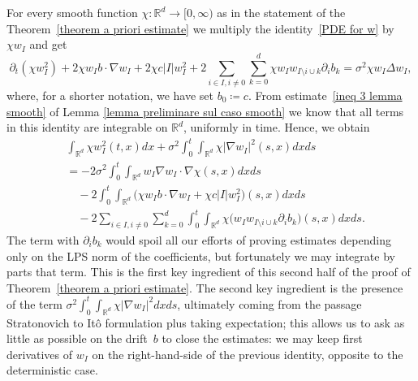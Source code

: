 \documentclass[a4paper,10pt]{article}
\newcommand\1{\mathbbm{1}}
\numberwithin{equation}{section}
\begin{document}
For every smooth function $\chi:\mathbb{R}^{d}\rightarrow \lbrack0,\infty)$ as in the statement of the Theorem~\ref{theorem a priori estimate} we multiply the identity~\eqref{PDE for w} by $\chi w_I$ and get
\[
\partial_{t}(\chi w_{I}^{2})  +2\chi w_{I}b\cdot\nabla
w_{I}+2\chi c\vert I\vert w_{I}^{2}+2\sum_{i\in I,i\neq0}\sum
_{k=0}^{d}\chi w_{I}w_{I\setminus i\cup k}\partial_{i}b_{k}=\sigma^{2}\chi
w_{I}\Delta w_{I},
\]
where, for a shorter notation, we have set $b_0 \coloneqq  c$. From estimate~\eqref{ineq 3 lemma smooth} of Lemma \ref{lemma preliminare sul caso smooth} we know that all terms in this identity are integrable on $\mathbb{R}^{d}$, uniformly in time. Hence, we obtain
\begin{align*}
&  \int_{\mathbb{R}^{d}}\chi w_{I}^{2}(t,x)  dx+\sigma^{2} 
\int_{0}^{t}\int_{\mathbb{R}^{d}}\chi\vert \nabla w_{I}\vert
^{2} (s,x)dxds\\
&  =-2\sigma^{2}\int_{0}^{t}\int_{\mathbb{R}^{d}}w_{I}\nabla w_{I}\cdot\nabla\chi  (s,x) dxds\\
& \quad {}  -2\int_{0}^{t}\int_{\mathbb{R}^{d}} \big(\chi w_{I}b\cdot\nabla
w_{I}+\chi c\vert I\vert w_{I}^{2} \big)  (s,x)
dxds\\
& \quad {}  -2\sum_{i\in I,i\neq0}\sum_{k=0}^{d}\int_{0}^{t}\int_{\mathbb{R}^{d}} 
\chi \big(w_{I}w_{I\setminus i\cup k}\partial_{i}b_{k}\big)  (
s,x)  dxds .
\end{align*}
The term with $\partial_{i}b_{k}$ would spoil all our efforts of proving estimates depending only on the LPS norm of the coefficients, but fortunately we may integrate by parts that term. This is the first key ingredient of this second half of the proof of Theorem~\ref{theorem a priori estimate}. The second key ingredient is the presence of the term $\sigma^{2}\int_{0}^{t}\int_{\mathbb{R}^{d}}\chi\vert \nabla w_{I}\vert ^{2}dxds$, ultimately coming from the passage Stratonovich to It\^o formulation plus taking expectation; this allows us to ask as little as possible on the drift~$b$ to close the estimates: we may keep first derivatives of $w_{I}$ on the right-hand-side of the previous identity, opposite to the deterministic case.
\end{document}
